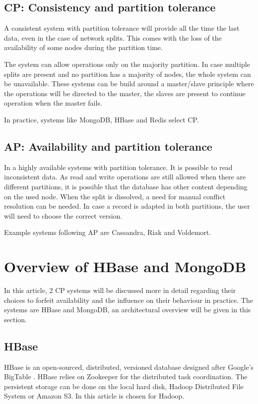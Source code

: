 \documentclass[10pt,conference,letterpaper]{IEEEtran}
\begin{document}
\subsection{CP: Consistency and partition tolerance}
A consistent system with partition tolerance will provide all the time the last data, even in the case of network splits. This comes with the loss of the availability of some nodes during the partition time.

The system can allow operations only on the majority partition. In case multiple splits are present and no partition has a majority of nodes, the whole system can be unavailable. These systems can be build around a master/slave principle where the operations will be directed to the master, the slaves are present to continue operation when the master fails.

In practice, systems like MongoDB, HBase and Redis select CP. 

\subsection{AP: Availability and partition tolerance}
In a highly available systems with partition tolerance. It is possible to read inconsistent data. As read and write operations are still allowed when there are different partitions, it is possible that the database has other content depending on the used node. When the split is dissolved, a need for manual conflict resolution can be needed. In case a record is adapted in both partitions, the user will need to choose the correct version. 

Example systems following AP are Cassandra, Riak and Voldemort. 

\section{Overview of HBase and MongoDB}\label{sec:hbaseandmongodb}
In this article, 2 CP systems will be discussed more in detail regarding their choices to forfeit availability and the influence on their behaviour in practice. The systems are HBase and MongoDB, an architectural overview will be given in this section. 

\subsection{HBase}
HBase\cite{hbase-doc} is an open-sourced, distributed, versioned database designed after Google's BigTable \cite{chang2008bigtable}. HBase relies on Zookeeper for the distributed task coordination. The persistent storage can be done on the local hard disk, Hadoop Distributed File System or Amazon S3. In this article is chosen for Hadoop. 
\end{document}
